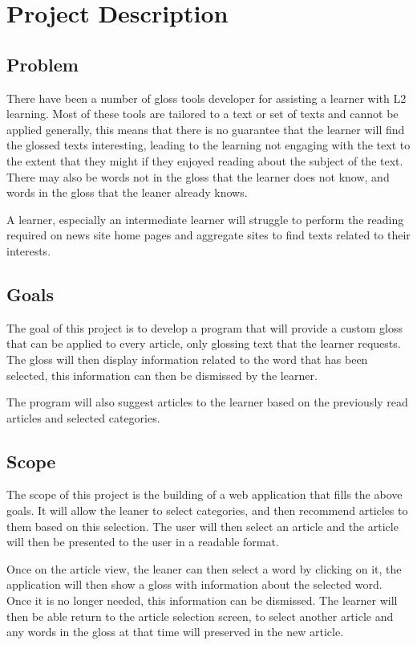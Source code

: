 \chapter{Project Description}
\section{Problem}

There have been a number of gloss tools developer for assisting a learner with L2 learning. Most of these tools are tailored to a text or set of texts and cannot be applied generally, this means that there is no guarantee that the learner will find the glossed texts interesting, leading to the learning not engaging with the text to the extent that they might if they enjoyed reading about the subject of the text. There may also be words not in the gloss that the learner does not know, and words in the gloss that the leaner already knows. 


A learner, especially an intermediate learner will struggle to perform the reading required on news site home pages and aggregate sites to find texts related to their interests. 
\section{Goals}

The goal of this project is to develop a program that will provide a custom gloss that can be applied to every article, only glossing text that the learner requests. The gloss will then display information related to the word that has been selected, this information can then be dismissed by the learner.

The program will also suggest articles to the learner based on the previously read articles and selected categories. 



\section{Scope}

The scope of this project is the building of a web application that fills the above goals. It will allow the leaner to select categories, and then recommend articles to them based on this selection. The user will then select an article and the article will then be presented to the user in a readable format.

Once on the article view, the leaner can then select a word by clicking on it, the application will then show a gloss with information about the selected word. Once it is no longer needed, this information can be dismissed. The learner will then be able return to the  article selection screen, to select another article and any words in the gloss at that time will preserved in the new article. 